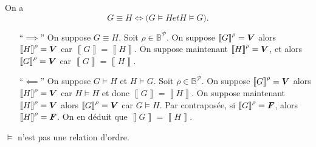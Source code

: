 \begin{prop}
	On a \[
		G \equiv H \iff \big(G \models H \mathrel{et} H \models G\big)
	.\]
\end{prop}

\begin{prv}
	\begin{itemize}
		\item[``$\implies$\/''] On suppose $G \equiv H$. Soit $\rho \in \mathds{B}^{\mathcal{P}}$. On suppose $\left\llbracket G \right\rrbracket^\rho = {\bm{V}}\/ $\/ alors $\left\llbracket H \right\rrbracket^{\rho} = {\bm{V}}\/$\/ car $\left\llbracket G \right\rrbracket = \left\llbracket H \right\rrbracket$.
			On suppose maintenant $\left\llbracket H \right\rrbracket^{\rho} = {\bm{V}}\/$, et alors $\left\llbracket G \right\rrbracket^\rho = {\bm{V}}\/$\/ car $\left\llbracket G \right\rrbracket = \left\llbracket H \right\rrbracket$.
		\item[``$\impliedby$\/'']  On suppose $G \models H$\/ et $H \models G$. Soit $\rho \in \mathds{B}^{\mathcal{P}}$. On suppose $\left\llbracket G \right\rrbracket^{\rho} = {\bm{V}}\/$\/ alors $\left\llbracket H \right\rrbracket^\rho = {\bm{V}}\/$\/ car $H \models H$\/ et donc $\left\llbracket G \right\rrbracket = \left\llbracket H \right\rrbracket$. On suppose maintenant $\left\llbracket H \right\rrbracket^\rho = {\bm{V}}\/$\/ alors $\left\llbracket G \right\rrbracket^\rho = {\bm{V}}\/$\/ car $G \models H$. Par contraposée, si $\left\llbracket G \right\rrbracket^\rho = {\bm{F}}\/$, alors $\left\llbracket H \right\rrbracket^\rho = {\bm{F}}\/$. On en déduit que $\left\llbracket G \right\rrbracket = \left\llbracket H \right\rrbracket$.
	\end{itemize}
\end{prv}

\begin{rmk}
	$\models$\/ n'est pas une relation d'ordre.
\end{rmk}


